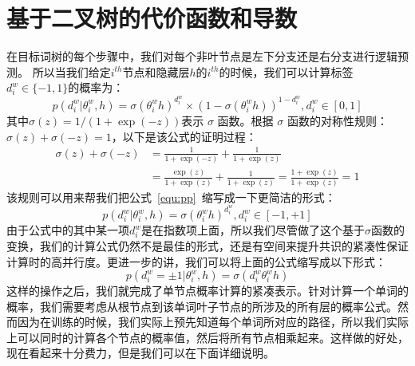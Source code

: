 \section{基于二叉树的代价函数和导数}
在目标词树的每个步骤中，我们对每个非叶节点是左下分支还是右分支进行逻辑预测。 所以当我们给定$ i^{th} $节点和隐藏层$ h $的$ i^{th} $的时候，我们可以计算标签 $d^w_i\in \{-1,1\}$的概率为：
 \begin{equation}\label{equ:pp}
p(d^w_i|\theta_{i}^w,h) =\sigma(\theta_{i}^w h)^{d_i^w}\times(1-\sigma(\theta_{i}^w h))^{1-{d_i^w}},d_i^w \in [0,1]
\end{equation}
其中$ \sigma(z)= 1 /(1 + \exp(-z))$表示 $\sigma$ 函数。根据 $\sigma$ 函数的对称性规则：$\sigma(z)+ \sigma(-z)=1 $，以下是该公式的证明过程：
\begin{equation}\label{equ:sig}
\begin{split}
\sigma(z)+ \sigma(-z)  &=\frac{1}{1 + \exp(-z)}+\frac{1}{1 + \exp(z)}\\
  &=\frac{\exp(z)}{1 + \exp(z)}+\frac{1}{1 + \exp(z)}=\frac{1 + \exp(z)}{1 + \exp(z)}=1
\end{split}
\end{equation}
该规则可以用来帮我们把公式~\ref{equ:pp}~缩写成一下更简洁的形式：
 \begin{equation}
p(d^w_i|\theta_{i}^w,h) =\sigma(\theta_{i}^w h)^{d_i^w}, d_i^w \in [-1,+1]
\end{equation}
由于公式中的其中某一项${d_i^w}$是在指数项上面，所以我们尽管做了这个基于$\sigma$函数的变换，我们的计算公式仍然不是最佳的形式，还是有空间来提升共识的紧凑性保证计算时的高并行度。更进一步的讲，我们可以将上面的公式缩写成以下形式：
\begin{equation}
p(d^w_i=\pm 1|\theta_{i}^w,h) = \sigma({d_i^w}\theta_{i}^w h)
\end{equation}
这样的操作之后，我们就完成了单节点概率计算的紧凑表示。针对计算一个单词的概率，我们需要考虑从根节点到该单词叶子节点的所涉及的所有层的概率公式。然而因为在训练的时候，我们实际上预先知道每个单词所对应的路径，所以我们实际上可以同时的计算各个节点的概率值，然后将所有节点相乘起来。这样做的好处，现在看起来十分费力，但是我们可以在下面详细说明。

